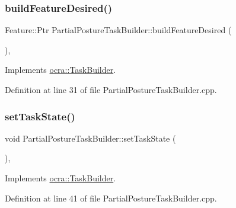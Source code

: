 \subsubsection{\texorpdfstring{build\+Feature\+Desired()}{buildFeatureDesired()}}
{\footnotesize\ttfamily Feature\+::\+Ptr Partial\+Posture\+Task\+Builder\+::build\+Feature\+Desired (\begin{DoxyParamCaption}{ }\end{DoxyParamCaption})\hspace{0.3cm}{\ttfamily [protected]}, {\ttfamily [virtual]}}



Implements \hyperlink{classocra_1_1TaskBuilder_a7a2c8bcc5d95160d0e48806a2648f1a5}{ocra\+::\+Task\+Builder}.



Definition at line 31 of file Partial\+Posture\+Task\+Builder.\+cpp.

\hypertarget{classocra_1_1PartialPostureTaskBuilder_a70b416b1666a772940d96338a317af0a}{}\label{classocra_1_1PartialPostureTaskBuilder_a70b416b1666a772940d96338a317af0a} 
\subsubsection{\texorpdfstring{set\+Task\+State()}{setTaskState()}}
{\footnotesize\ttfamily void Partial\+Posture\+Task\+Builder\+::set\+Task\+State (\begin{DoxyParamCaption}{ }\end{DoxyParamCaption})\hspace{0.3cm}{\ttfamily [protected]}, {\ttfamily [virtual]}}



Implements \hyperlink{classocra_1_1TaskBuilder_a7b44bfa101566ea4400e2d9bfdb9ff32}{ocra\+::\+Task\+Builder}.



Definition at line 41 of file Partial\+Posture\+Task\+Builder.\+cpp.

\hypertarget{classocra_1_1PartialPostureTaskBuilder_acf2b5f880dc19e43356552b348d8a010}{}\label{classocra_1_1PartialPostureTaskBuilder_acf2b5f880dc19e43356552b348d8a010} 
